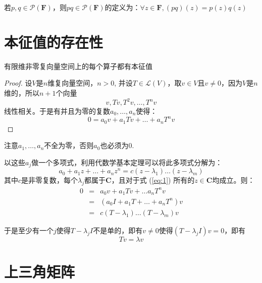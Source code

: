 \documentclass[10pt,a4paper,UTF8]{article}
\begin{document}
\begin{definition}
若\(p,q\in \mathcal{P}(\mathbf{F})\)，则\(pq\in \mathcal{P}(\mathbf{F})\)的定义为：\(\forall z\in \mathbf{F}, (pq)(z) = p(z)q(z)\)
\end{definition}

\section{本征值的存在性}
\label{sec:org6b80e4a}


\begin{theorem}
有限维非零复向量空间上的每个算子都有本征值
\end{theorem}
\begin{proof}
设\(V\)是\(n\)维复向量空间，\(n > 0\), 并设\(T\in \mathcal{L}(V)\)，取\(v\in V\)且\(v\neq 0\)，因为\(V\)是\(n\)维的，所以\(n+1\)个向量\[v,Tv,T^{2}v,\ldots ,T^{n}v\]线性相关。于是有并且为零的复数\(a_{0},\ldots ,a_{n}\)使得：
\[0 = a_{0}v  + a_{1}Tv + \ldots + a_{n}T^{n}v\]
\end{proof}
注意\(a_{1},\ldots ,a_{n}\)不全为零，否则\(a_{0}\)也必须为0.

以这些\(a_{j}\)做一个多项式，利用代数学基本定理可以将此多项式分解为：
\begin{equation}
\label{eq:1}
a_{0} + a_{1}z + \ldots + a_{n}z^{n} = c(z-\lambda_{1})\ldots (z-\lambda_{m})
\end{equation}
其中\(c\)是非零复数，每个\(\lambda_{j}\)都属于\(\mathbf{C}\)，且对于式 (\ref{eq:1}) 所有的\(z\in \mathbf{C}\)均成立。则：
\begin{eqnarray}
\label{eq:3}
0&=& a_{0}v + a_{1}Tv + \ldots a_{n}T^{n}v \\
&=& (a_{0}I + a_{1}T + \ldots + a_{n}T^{n})v \\
&=&c(T-\lambda_{1}) \ldots (T-\lambda_{m})v
\end{eqnarray}

于是至少有一个\(j\)使得\(T-\lambda_{j}I\)不是单的，即有\(v\neq 0\)使得\((T-\lambda_{j}I)v = 0\)，即有\[Tv = \lambda v\]

\section{上三角矩阵}
\label{sec:org46ad8e7}
\end{document}
